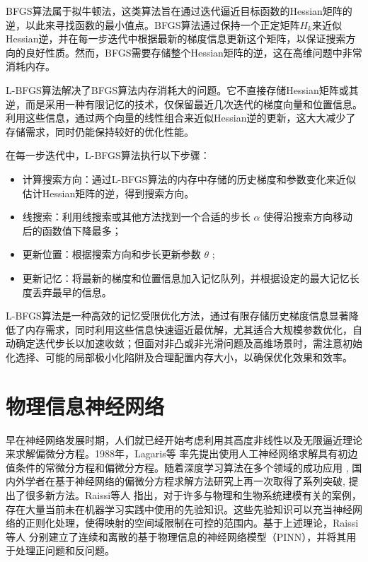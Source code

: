 BFGS算法属于拟牛顿法，这类算法旨在通过迭代逼近目标函数的Hessian矩阵的逆，以此来寻找函数的最小值点。BFGS算法通过保持一个正定矩阵$H_k$来近似Hessian逆，并在每一步迭代中根据最新的梯度信息更新这个矩阵，以保证搜索方向的良好性质。然而，BFGS需要存储整个Hessian矩阵的逆，这在高维问题中非常消耗内存。

L-BFGS算法解决了BFGS算法内存消耗大的问题。它不直接存储Hessian矩阵或其逆，而是采用一种有限记忆的技术，仅保留最近几次迭代的梯度向量和位置信息。利用这些信息，通过两个向量的线性组合来近似Hessian逆的更新，这大大减少了存储需求，同时仍能保持较好的优化性能。

在每一步迭代中，L-BFGS算法执行以下步骤：
\begin{itemize}
    \item 计算搜索方向：通过L-BFGS算法的内存中存储的历史梯度和参数变化来近似估计Hessian矩阵的逆，得到搜索方向。
    \item 线搜索：利用线搜索或其他方法找到一个合适的步长 $\alpha$ 使得沿搜索方向移动后的函数值下降最多；
    \item 更新位置：根据搜索方向和步长更新参数 $\theta$ ;
    \item 更新记忆：将最新的梯度和位置信息加入记忆队列，并根据设定的最大记忆长度丢弃最早的信息。
\end{itemize}

L-BFGS算法是一种高效的记忆受限优化方法，通过有限存储历史梯度信息显著降低了内存需求，同时利用这些信息快速逼近最优解，尤其适合大规模参数优化，自动确定迭代步长以加速收敛；但面对非凸或非光滑问题及高维场景时，需注意初始化选择、可能的局部极小化陷阱及合理配置内存大小，以确保优化效果和效率。

\section{物理信息神经网络}

早在神经网络发展时期，人们就已经开始考虑利用其高度非线性以及无限逼近理论来求解偏微分方程。1988年，Lagaris等 \cite{lagaris1998artificial}率先提出使用人工神经网络求解具有初边值条件的常微分方程和偏微分方程。随着深度学习算法在多个领域的成功应用 \cite{krizhevsky2012imagenet,devlin2018bert,cheng2016wide}, 国内外学者在基于神经网络的偏微分方程求解方法研究上再一次取得了系列突破, 提出了很多新方法。Raissi等人 \cite{raissi2019physics}指出，对于许多与物理和生物系统建模有关的案例，存在大量当前未在机器学习实践中使用的先验知识。这些先验知识可以充当神经网络的正则化处理，使得映射的空间域限制在可控的范围内。基于上述理论，Raissi等人 \cite{raissi2019physics}分别建立了连续和离散的基于物理信息的神经网络模型（PINN），并将其用于处理正问题和反问题。

